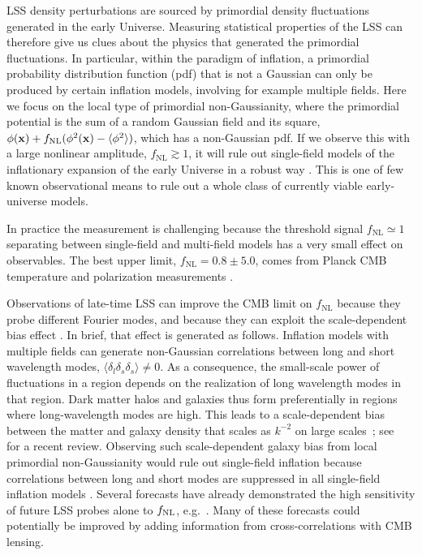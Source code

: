 \documentclass[prd,superscriptaddress,floatfix,notitlepage,nofootinbib,reprint]{revtex4-1} %
\begin{document}
LSS density perturbations are sourced by primordial density fluctuations generated in the early Universe.
Measuring statistical properties of the LSS can therefore give us clues about the physics that generated the primordial fluctuations.
In particular, within the paradigm of inflation, a primordial probability distribution function (pdf) that is not a Gaussian can only be produced by certain inflation models, involving for example multiple fields. 
Here we focus on the local type of primordial non-Gaussianity, where the primordial potential is the sum of a random Gaussian field and its square, $\phi({\mathbf{x}})+{f_\mathrm{NL}}(\phi^2({\mathbf{x}})-\langle\phi^2\rangle)$, which has a non-Gaussian pdf. 
If we observe this with a large nonlinear amplitude, $f_\mathrm{NL}\gtrsim 1$, it will rule out single-field models of the inflationary expansion of the early Universe in a robust way \cite{Maldacena2003,Creminelli2004}.
This is one of few known observational means to rule out a whole class of currently viable early-universe models.

In practice the measurement is challenging because the threshold signal $f_\mathrm{NL}\simeq 1$ separating between single-field and multi-field models has a very small effect on observables.
The best upper limit, $f_\mathrm{NL}=0.8\pm 5.0$, comes from Planck CMB temperature and polarization measurements \cite{Planck15fnl}.

Observations of late-time LSS can improve the CMB limit on $f_\mathrm{NL}$ because they probe different Fourier modes, and because they can exploit the 
scale-dependent bias effect \cite{Dalal0710}. 
In brief, that effect is generated as follows. 
Inflation models with multiple fields can generate non-Gaussian correlations between long and short wavelength modes, $\langle\delta_l\delta_s\delta_s\rangle\neq 0$.
As a consequence, the small-scale power of fluctuations in a region depends on the realization of long wavelength modes in that region. 
Dark matter halos and galaxies thus form preferentially in regions where long-wavelength modes are high.
This leads to a scale-dependent bias between the matter and galaxy density that scales as $k^{-2}$ on large scales~\cite{Dalal0710}; see~\cite{Alvarez1412} for a recent review.
Observing such scale-dependent galaxy bias from local primordial non-Gaussianity would rule out single-field inflation because correlations between long and short modes are suppressed in all single-field inflation models \cite{Maldacena2003,Creminelli2004}.
Several forecasts have already demonstrated the high sensitivity of future LSS probes alone to ${f_\mathrm{NL}}$, e.g.~\cite{Raccanelli1409,Camera1409,Spherex1412,dePutter1412,Alonso1507,Tucci1606}.  Many of these forecasts could potentially be improved by adding information from cross-correlations with CMB lensing.
\end{document}
